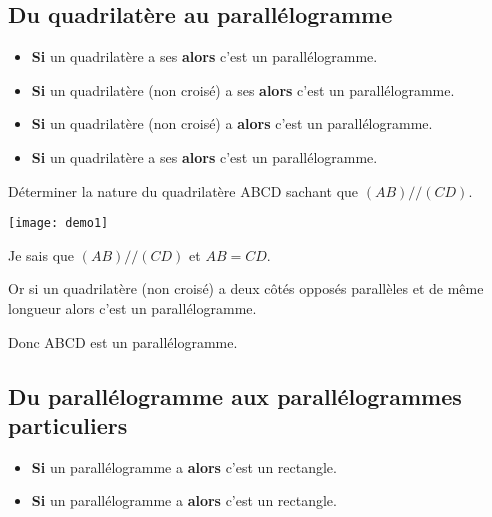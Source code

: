 \subsection{Du quadrilatère au parallélogramme}

	\begin{myprops}
		\begin{itemize}
			\item \textbf{Si} un quadrilatère a ses  \textbf{alors} c'est un parallélogramme.
			\item \textbf{Si} un quadrilatère (non croisé) a ses  \textbf{alors} c'est un parallélogramme.
			\item \textbf{Si} un quadrilatère (non croisé) a  \textbf{alors} c'est un parallélogramme.
			
			\item \textbf{Si} un quadrilatère a ses  \textbf{alors} c'est un parallélogramme.
			
		\end{itemize}
	\end{myprops}

	\begin{myex}
		Déterminer la nature du quadrilatère ABCD sachant que $(AB)//(CD)$.
		
			\begin{center}
				\texttt{[image: demo1]}
			\end{center}
			
			Je sais que $(AB)//(CD)$ et $AB=CD$.
			
			Or si un quadrilatère (non croisé) a deux côtés opposés parallèles et de même longueur alors c'est un parallélogramme.
			
			Donc ABCD est un parallélogramme.
			
		
	\end{myex}


\subsection{Du parallélogramme aux parallélogrammes particuliers}

	\begin{myprop}
		
		\begin{itemize}
			\item \textbf{Si} un parallélogramme a  \textbf{alors} c'est un rectangle.
			\item \textbf{Si} un parallélogramme a  \textbf{alors} c'est un rectangle.
		\end{itemize}
	\end{myprop}


